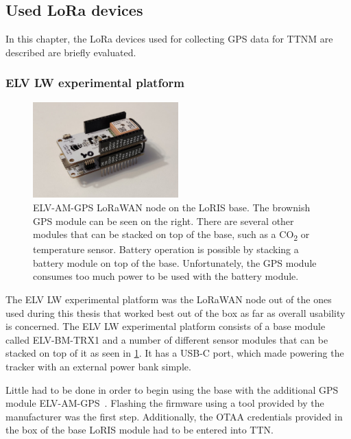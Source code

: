 \subsection{Used \acs{LoRa} devices}\label{subsec:used-lora-devices}

In this chapter, the \ac{LoRa} devices used for collecting \ac{GPS} data for \ac{TTNM} are described are briefly evaluated.

\subsubsection{ELV LW experimental platform}

\begin{figure}[htbp]
    \centering
    \includegraphics[width=0.5\textwidth]{pictures/hardware/gps-nodes/loris_bare.jpg}
    \caption{
        ELV-AM-GPS \ac{LoRaWAN} node on the LoRIS base.
        The brownish \ac{GPS} module can be seen on the right.
        There are several other modules that can be stacked on top of the base, such as a CO\textsubscript{2} or temperature sensor.
        Battery operation is possible by stacking a battery module on top of the base.
        Unfortunately, the \ac{GPS} module consumes too much power to be used with the battery module.
    }\label{pic:loris-node-bare}
\end{figure}

The ELV LW experimental platform was the \ac{LoRaWAN} node out of the ones used during this thesis that worked best out of the box as far as overall usability is concerned\cite{elv_elektronik_ag_elv-lw-base_2023}.
The ELV LW experimental platform consists of a base module called ELV-BM-TRX1 and a number of different sensor modules that can be stacked on top of it as seen in \cref{pic:loris-node-bare}.
It has a USB-C port, which made powering the tracker with an external power bank simple.

Little had to be done in order to begin using the base with the additional \ac{GPS} module ELV-AM-GPS~\cite{elv_elektronik_ag_elv-track_2022}.
Flashing the firmware using a tool provided by the manufacturer was the first step.
Additionally, the \ac{OTAA} credentials provided in the box of the base LoRIS module had to be entered into \ac{TTN}.

